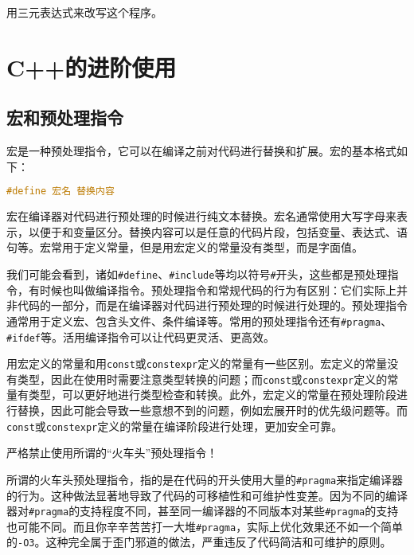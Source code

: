 \begin{exercise}
  用三元表达式来改写这个程序。
\end{exercise}

\section{C++的进阶使用}

\subsection{宏和预处理指令}\label{sec:macro}

宏是一种预处理指令，它可以在编译之前对代码进行替换和扩展。宏的基本格式如下：
\begin{lstlisting}[language=C++]
#define 宏名 替换内容
\end{lstlisting}
宏在编译器对代码进行预处理的时候进行纯文本替换。宏名通常使用大写字母来表示，以便于和变量区分。替换内容可以是任意的代码片段，包括变量、表达式、语句等。宏常用于定义常量，但是用宏定义的常量没有类型，而是字面值。

我们可能会看到，诸如\texttt{\#define}、\texttt{\#include}等均以符号\texttt{\#}开头，这些都是预处理指令，有时候也叫做编译指令。预处理指令和常规代码的行为有区别：它们实际上并非代码的一部分，而是在编译器对代码进行预处理的时候进行处理的。预处理指令通常用于定义宏、包含头文件、条件编译等。常用的预处理指令还有\texttt{\#pragma}、\texttt{\#ifdef}等。活用编译指令可以让代码更灵活、更高效。

\begin{tip}
    用宏定义的常量和用\texttt{const}或\texttt{constexpr}定义的常量有一些区别。宏定义的常量没有类型，因此在使用时需要注意类型转换的问题；而\texttt{const}或\texttt{constexpr}定义的常量有类型，可以更好地进行类型检查和转换。此外，宏定义的常量在预处理阶段进行替换，因此可能会导致一些意想不到的问题，例如宏展开时的优先级问题等。而\texttt{const}或\texttt{constexpr}定义的常量在编译阶段进行处理，更加安全可靠。  
\end{tip}

\begin{warning}
    严格禁止使用所谓的“火车头”预处理指令！

    所谓的火车头预处理指令，指的是在代码的开头使用大量的\texttt{\#pragma}来指定编译器的行为。这种做法显著地导致了代码的可移植性和可维护性变差。因为不同的编译器对\texttt{\#pragma}的支持程度不同，甚至同一编译器的不同版本对某些\texttt{\#pragma}的支持也可能不同。而且你辛辛苦苦打一大堆\texttt{\#pragma}，实际上优化效果还不如一个简单的\texttt{-O3}。这种完全属于歪门邪道的做法，严重违反了代码简洁和可维护的原则。
\end{warning}

